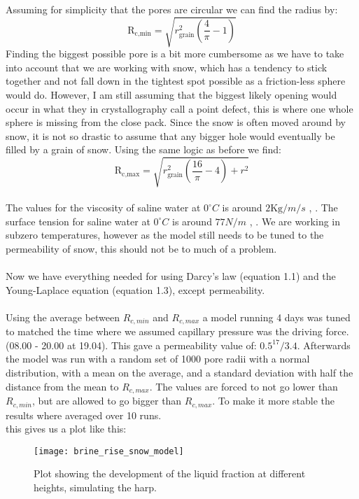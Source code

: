 Assuming for simplicity that the pores are circular we can find the radius by:
\begin{equation}
    \text{R}_{\text{c,min}} = \sqrt{r_{\text{grain}}^2\left(\frac{4}{\pi}-1\right)}
\end{equation}
Finding the biggest possible pore is a bit more cumbersome as we have to take into account that we are working with snow, which has a tendency to stick together and not fall down in the tightest spot possible as a friction-less sphere would do. However, I am still assuming that the biggest likely opening would occur in what they in crystallography call a point defect, this is where one whole sphere is missing from the close pack. Since the snow is often moved around by snow, it is not so drastic to assume that any bigger hole would eventually be filled by a grain of snow. Using the same logic as before we find:
\begin{equation}
    \text{R}_{\text{c,max}} = \sqrt{r_{\text{grain}}^2\left(\frac{16}{\pi}-4\right) + r^2}
\end{equation}
\\
The values for the viscosity of saline water at $0^{\circ}C$ is around $2 \text{Kg}/m/s$ \textcite{Viscosity_1}, \textcite{Viscosity_2}. The surface tension for saline water at $0^{\circ}C$ is around $77 N/m$ \textcite{SurfaceTension_1}, \textcite{SurfaceTension_2}. We are working in subzero temperatures, however as the model still needs to be tuned to the permeability of snow, this should not be to much of a problem.\\
\\
Now we have everything needed for using Darcy's law (equation 1.1) and the Young-Laplace equation (equation 1.3), except permeability.\\
\\
Using the average between $R_{c,min}$ and $R_{c, max}$ a model running 4 days was tuned to matched the time where we assumed capillary pressure was the driving force. (08.00 - 20.00 at 19.04). This gave a permeability value of: $0.5^{17}/3.4$. Afterwards the model was run with a random set of 1000 pore radii with a normal distribution, with a mean on the average, and a standard deviation with half the distance from the mean to $R_{c,max}$. The values are forced to not go lower than $R_{c,min}$, but are allowed to go bigger than $R_{c,max}$. To make it more stable the results where averaged over 10 runs. \\
this gives us a plot like this:

\begin{figure}[h!]
\centering
\texttt{[image: brine\_rise\_snow\_model]}
\caption{Plot showing the development of the liquid fraction at different heights, simulating the harp.}
\label{modelski}
\end{figure}

